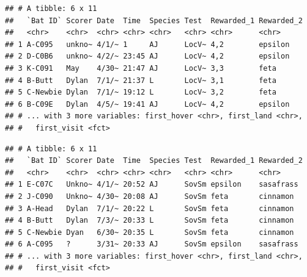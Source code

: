 \documentclass[]{article}
\newenvironment{Shaded}{\begin{snugshade}}{\end{snugshade}}
\newcommand{\KeywordTok}[1]{\textcolor[rgb]{0.13,0.29,0.53}{\textbf{{#1}}}}
\newcommand{\DataTypeTok}[1]{\textcolor[rgb]{0.13,0.29,0.53}{{#1}}}
\newcommand{\StringTok}[1]{\textcolor[rgb]{0.31,0.60,0.02}{{#1}}}
\newcommand{\CommentTok}[1]{\textcolor[rgb]{0.56,0.35,0.01}{\textit{{#1}}}}
\newcommand{\NormalTok}[1]{{#1}}
\begin{document}
\begin{verbatim}
## # A tibble: 6 x 11
##   `Bat ID` Scorer Date  Time  Species Test  Rewarded_1 Rewarded_2
##   <chr>    <chr>  <chr> <chr> <chr>   <chr> <chr>      <chr>     
## 1 A-C095   unkno~ 4/1/~ 1     AJ      LocV~ 4,2        epsilon   
## 2 D-C0B6   unkno~ 4/2/~ 23:45 AJ      LocV~ 4,2        epsilon   
## 3 K-C091   May    4/30~ 21:47 AJ      LocV~ 3,3        feta      
## 4 B-Butt   Dylan  7/1/~ 21:37 L       LocV~ 3,1        feta      
## 5 C-Newbie Dylan  7/1/~ 19:12 L       LocV~ 3,2        feta      
## 6 B-C09E   Dylan  4/5/~ 19:41 AJ      LocV~ 4,2        epsilon   
## # ... with 3 more variables: first_hover <chr>, first_land <chr>,
## #   first_visit <fct>
\end{verbatim}

\begin{Shaded}
\end{Shaded}

\begin{verbatim}
## # A tibble: 6 x 11
##   `Bat ID` Scorer Date  Time  Species Test  Rewarded_1 Rewarded_2
##   <chr>    <chr>  <chr> <chr> <chr>   <chr> <chr>      <chr>     
## 1 E-C07C   Unkno~ 4/1/~ 20:52 AJ      SovSm epsilon    sasafrass 
## 2 J-C090   Unkno~ 4/30~ 20:08 AJ      SovSm feta       cinnamon  
## 3 A-Head   Dylan  7/1/~ 20:22 L       SovSm feta       cinnamon  
## 4 B-Butt   Dylan  7/3/~ 20:33 L       SovSm feta       cinnamon  
## 5 C-Newbie Dyan   6/30~ 20:35 L       SovSm feta       cinnamon  
## 6 A-C095   ?      3/31~ 20:33 AJ      SovSm epsilon    sasafrass 
## # ... with 3 more variables: first_hover <chr>, first_land <chr>,
## #   first_visit <fct>
\end{verbatim}

\begin{Shaded}
\end{Shaded}
\end{document}
